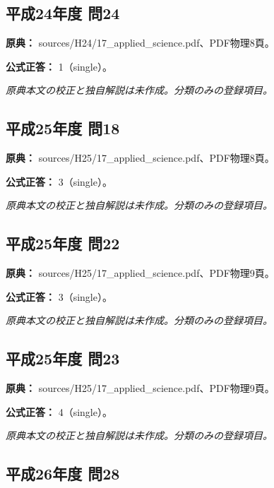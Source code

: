 \subsection{平成24年度 問24}
\label{q:h24-reg-applied-24}

\noindent\textbf{原典：} sources/H24/17\_applied\_science.pdf、PDF物理8頁。

\textbf{公式正答：} 1（single）。

\par\textit{原典本文の校正と独自解説は未作成。分類のみの登録項目。}

\subsection{平成25年度 問18}
\label{q:h25-reg-applied-18}

\noindent\textbf{原典：} sources/H25/17\_applied\_science.pdf、PDF物理8頁。

\textbf{公式正答：} 3（single）。

\par\textit{原典本文の校正と独自解説は未作成。分類のみの登録項目。}

\subsection{平成25年度 問22}
\label{q:h25-reg-applied-22}

\noindent\textbf{原典：} sources/H25/17\_applied\_science.pdf、PDF物理9頁。

\textbf{公式正答：} 3（single）。

\par\textit{原典本文の校正と独自解説は未作成。分類のみの登録項目。}

\subsection{平成25年度 問23}
\label{q:h25-reg-applied-23}

\noindent\textbf{原典：} sources/H25/17\_applied\_science.pdf、PDF物理9頁。

\textbf{公式正答：} 4（single）。

\par\textit{原典本文の校正と独自解説は未作成。分類のみの登録項目。}

\subsection{平成26年度 問28}
\label{q:h26-reg-applied-28}

